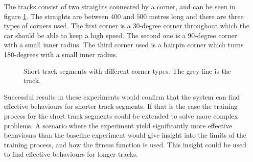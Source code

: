 The tracks consist of two straights connected by a corner, and can be seen in figure \ref{fig:short_tracks}. The straights are between $400$ and $500$ metres long and there are three types of corners used. The first corner is a 30-degree corner throughout which the car should be able to keep a high speed. The second one is a 90-degree corner with a small inner radius. The third corner used is a hairpin corner which turns 180-degrees with a small inner radius. 
\begin{figure}[H]
    \centering
    \qquad
    \qquad

    \caption{Short track segments with different corner types. The grey line is the track.}
    \label{fig:short_tracks}
\end{figure}

\noindent
Successful results in these experiments would confirm that the system can find effective behaviours for shorter track segments. If that is the case the training process for the short track segments could be extended to solve more complex problems. A scenario where the experiment yield significantly more effective behaviours than the baseline experiment would give insight into the limits of the training process, and how the fitness function is used. This insight could be used to find effective behaviours for longer tracks. 



